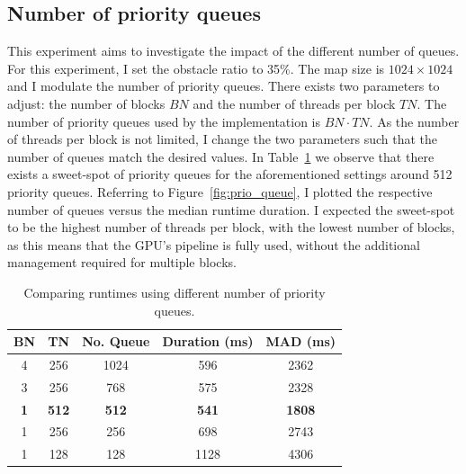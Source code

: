 \documentclass{article}
\begin{document}
\subsection{Number of priority queues}
\label{sec:prio_queue}
%
This experiment aims to investigate the impact of the different number of queues. For this experiment, I set the obstacle ratio to 35\%. The map size is $1024 \times 1024$ and I modulate the number of priority queues. There exists two parameters to adjust: the number of blocks $BN$ and the number of threads per block $TN$. The number of priority queues used by the implementation is $BN \cdot TN$. As the number of threads per block is not limited, I change the two parameters such that the number of queues match the desired values. In Table~\ref{tab:prio_queue} we observe that there exists a sweet-spot of priority queues for the aforementioned settings around 512 priority queues. Referring to Figure~\ref{fig:prio_queue}, I plotted the respective number of queues versus the median runtime duration. I expected the sweet-spot to be the highest number of threads per block, with the lowest number of blocks, as this means that the GPU's pipeline is fully used, without the additional management required for multiple blocks. 
%
\begin{table}[]
    \centering
    \begin{tabular}{|c|c|c|c|c|}
        \hline
        \textbf{BN} & \textbf{TN} & \textbf{No. Queue} & \textbf{Duration (ms)} & \textbf{MAD (ms)} \\
        \hline
        4 & 256 & 1024 & 596 & 2362 \\
        \hline
        3 & 256 & 768 & 575 & 2328 \\
        \hline
        \textbf{1} & \textbf{512} & \textbf{512} & \textbf{541} & \textbf{1808} \\
        \hline
        1 & 256 & 256 & 698 & 2743 \\
        \hline
        1 & 128 & 128 & 1128 & 4306 \\
        \hline
    \end{tabular}
    \caption{Comparing runtimes using different number of priority queues.}
    \label{tab:prio_queue}
\end{table}
%
\end{document}
